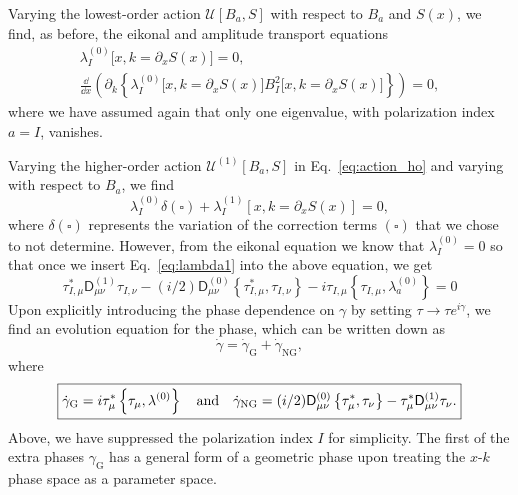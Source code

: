 Varying the lowest-order action $\mathscr{U}[B_{a}, S]$ with respect to $B_{a}$ and $S(x)$, we find, as before, the eikonal and amplitude transport equations
%
\begin{equation}
  \begin{gathered}
    \lambda_{I}^{(0)}\big[x, k=\partial_{x}S(x)\big] = 0,\\
\frac{\dd}{\dd{x}}\left(\partial_{k}\left\{\lambda_{I}^{(0)}\big[x, k=\partial_{x}S(x)\big]B^{2}_{I}\big[x, k=\partial_{x}S(x)\big]\right\}\right) = 0,
  \end{gathered}
\end{equation}
%
where we have assumed again that only one eigenvalue, with polarization index $a = I$, vanishes.

Varying the higher-order action $\mathscr{U}^{(1)}[B_{a}, S]$ in Eq.~\eqref{eq:action_ho} and varying with respect to $B_{a}$, we find
%
\begin{equation}
  \lambda_{I}^{(0)}\delta(\square) + \lambda_{I}^{(1)}\left[x, k=\partial_{x}S(x)\right] = 0,
\end{equation}
%
where $\delta(\square)$ represents the variation of the correction terms $(\square)$ that we chose to not determine.
However, from the eikonal equation we know that $\lambda_{I}^{(0)} = 0$ so that once we insert Eq.~\eqref{eq:lambda1} into the above equation, we get
%
\begin{equation}
\tau_{I,\mu}^{*}\mathsf{D}_{\mu\nu}^{(1)}\tau_{I,\nu} - (i/2)\mathsf{D}^{(0)}_{\mu\nu}\left\{\tau_{I,\mu}^{*}, \tau_{I,\nu}\right\}
  - i\tau_{I,\mu}\left\{\tau_{I,\mu}, \lambda^{(0)}_{a}\right\} = 0
\end{equation}
%
Upon explicitly introducing the phase dependence on $\gamma$ by setting $\tau \to \tau e^{i\gamma}$, we find an evolution equation for the phase, which can be written down as
%
\begin{equation}
  \dot{\gamma} = \dot{\gamma}_{\text{G}} + \dot{\gamma}_{\text{NG}},
\end{equation}
%
where
%
\begin{equation}\boxed{%
  \dot{\gamma}_{\text{G}} = i\tau_{\mu}^{*}\left\{\tau_{\mu}, \lambda^{(0)}\right\}
  \quad\text{and}\quad
\dot{\gamma}_{\text{NG}} = (i/2)\mathsf{D}^{(0)}_{\mu\nu}\left\{\tau_{\mu}^{*}, \tau_{\nu}\right\} - \tau_{\mu}^{*}\mathsf{D}_{\mu\nu}^{(1)}\tau_{\nu}.}
\label{eq:extra_phases}
\end{equation}
%
Above, we have suppressed the polarization index $I$ for simplicity.
The first of the extra phases $\gamma_{\text{G}}$ has a general form of a geometric phase upon treating the $x$-$k$ phase space as a parameter space.

